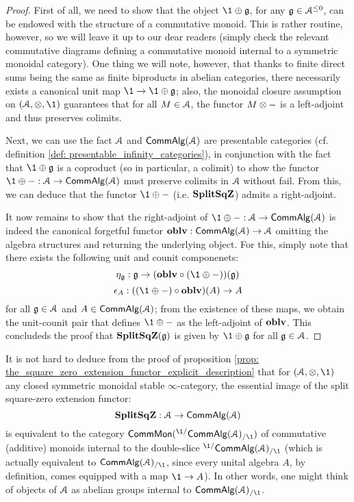                     \begin{proof}
                        First of all, we need to show that the object $\1 \oplus \g$, for any $\mathfrak{g} \in \mathcal{A}^{\leq 0}$, can be endowed with the structure of a commutative monoid. This is rather routine, however, so we will leave it up to our dear readers (simply check the relevant commutative diagrams defining a commutative monoid internal to a symmetric monoidal category). One thing we will note, however, that thanks to finite direct sums being the same as finite biproducts in abelian categories, there necessarily exists a canonical unit map $\1 \to \1 \oplus \g$; also, the monoidal closure assumption on $(\calA, \tensor, \1)$ guarantees that for all $M \in \mathcal{A}$, the functor $M \tensor -$ is a left-adjoint and thus preserves colimits.
                        
                        Next, we can use the fact $\mathcal{A}$ and $\mathsf{Comm}\mathsf{Alg}(\mathcal{A})$ are presentable categories (cf. definition \ref{def: presentable_infinity_categories}), in conjunction with the fact that $\1 \oplus \g$ is a coproduct (so in particular, a colimit) to show the functor $\1 \oplus -: \calA \to \Comm\Alg(\calA)$ must preserve colimits in $\mathcal{A}$ without fail. From this, we can deduce that the functor $\1 \oplus -$ (i.e. $\mathbf{Split}\mathbf{Sq}\mathbf{Z}$) admits a right-adjoint.
                        
                        It now remains to show that the right-adjoint of $\1 \oplus -: \calA \to \Comm\Alg(\calA)$ is indeed the canonical forgetful functor $\mathbf{oblv}: \mathsf{Comm}\mathsf{Alg}(\mathcal{A}) \to \mathcal{A}$ omitting the algebra structures and returning the underlying object. For this, simply note that there exists the following unit and counit componenets:
                            $$\eta_{\g}: \g \to ( \oblv \circ (\1 \oplus -) )(\g)$$
                            $$\e_A: ( (\1 \oplus -) \circ \oblv )(A) \to A$$
                        for all $\mathfrak{g} \in \mathcal{A}$ and $A \in \mathsf{Comm}\mathsf{Alg}(\mathcal{A})$; from the existence of these maps, we obtain the unit-counit pair that defines $\1 \oplus -$ as the left-adjoint of $\mathbf{oblv}$. This concludeds the proof that $\mathbf{Split}\mathbf{Sq}\mathbf{Z}(\mathfrak{g})$ is given by $\1 \oplus \g$ for all $\mathfrak{g} \in \mathcal{A}$.
                    \end{proof}
                \begin{corollary} \label{coro: internal_abelian_groups}
                    It is not hard to deduce from the proof of proposition \ref{prop: the_square_zero_extension_functor_explicit_description} that for $(\calA, \tensor, \1)$ any closed symmetric monoidal stable $\infty$-category, the essential image of the split square-zero extension functor:
                        $$\mathbf{Split}\mathbf{Sq}\mathbf{Z}: \mathcal{A} \to \mathsf{Comm}\mathsf{Alg}(\mathcal{A})$$
                    is equivalent to the category $\Comm\Mon( {}^{\1/}\Comm\Alg(\calA)_{/\1} )$ of commutative (additive) monoids internal to the double-slice ${}^{\1/}\Comm\Alg(\calA)_{/\1}$ (which is actually equivalent to $\Comm\Alg(\calA)_{/\1}$, since every unital algebra $A$, by definition, comes equipped with a map $\1 \to A$). In other words, one might think of objects of $\mathcal{A}$ as abelian groups internal to $\Comm\Alg(\calA)_{/\1}$.
                \end{corollary}
